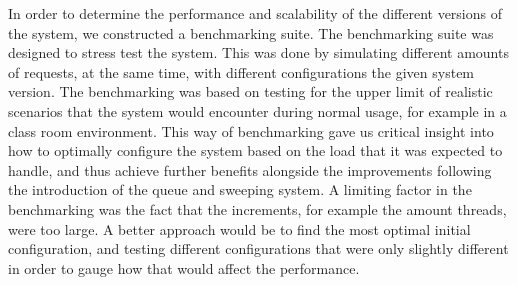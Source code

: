 In order to determine the performance and scalability of the different versions of the system, we constructed a benchmarking suite.
The benchmarking suite was designed to stress test the system.
This was done by simulating different amounts of requests, at the same time, with different configurations the given system version. The benchmarking was based on testing for the upper limit of realistic scenarios that the system would encounter during normal usage, for example in a class room environment.
This way of benchmarking gave us critical insight into how to optimally configure the system based on the load that it was expected to handle, and thus achieve further benefits alongside the improvements following the introduction of the queue and sweeping system. A limiting factor in the benchmarking was the fact that the increments, for example the amount threads, were too large.
A better approach would be to find the most optimal initial configuration, and testing different configurations that were only slightly different in order to gauge how that would affect the performance.
